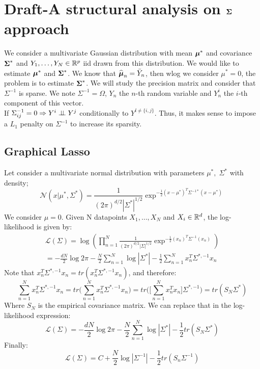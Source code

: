 \section{Draft-A structural analysis on $\boldsymbol\Sigma$ approach}

We consider a multivariate Gaussian distribution with mean $\boldsymbol\mu^*$ and covariance $\boldsymbol\Sigma^*$ and $Y_1,\dots,Y_N \in {\mathbb R}^p$ iid drawn from this distribution. We would like to estimate $\boldsymbol\mu^*$ and $\boldsymbol\Sigma^*$. We know that $\widehat{\boldsymbol\mu}_n=\bar Y_n$, then wlog we consider $\mu^*=0$, the problem is to estimate $\boldsymbol\Sigma^*$. We will study the precision matrix and consider that $\Sigma^{-1}$ is sparse. We note $\Sigma^{-1}=\Omega$, $Y_n$ the $n$-th random variable and $Y_n^i$ the $i$-th component of this vector.\\
If $\Sigma^{-1}_{ij}=0 \Rightarrow Y^i \perp\!\!\!\perp Y^j$ conditionally to $Y^{l\ne\{i,j\}}$. Thus, it makes sense to impose a $L_1$ penalty on $\Sigma^{-1}$ to increase its sparsity.

\subsection{Graphical Lasso}
Let consider a multivariate normal distribution with parameters $\mu^*,\; \Sigma^*$ with density;
\begin{equation}
\mathcal N(x|\mu^*,\Sigma^*)
=\frac{1}{(2\pi)^{d/2}|\Sigma^*|^{1/2}}\exp^{-\frac{1}{2}(x-\mu^*)^T\Sigma^{-1*}(x-\mu^*)}
\end{equation}
We consider $\mu=0$. Given N datapoints $X_1,\dots,X_N$ and $X_i \in {\mathbb R}^d$, the log-likelihood is given by:
\begin{equation}
\begin{split}
\mathcal{L}(\Sigma)=\log\left(\prod_{n=1}^N\frac{1}{(2\pi)^{d/2}|\Sigma|^{1/2}}\exp^{-\frac{1}{2}(x_n)^T\Sigma^{-1}(x_n)}\right)\\
=-\frac{dN}{2}\log 2\pi - \frac{N}{2}\sum_{n=1}^N\log |\Sigma^*|- \frac{1}{2}\sum_{n=1}^N x_n^T\Sigma^{*,-1}x_n
\end{split}
\end{equation}
Note that $x_n^T\Sigma^{*,-1}x_n=tr(x_n^T\Sigma^{*,-1}x_n)$, and therefore:
\begin{equation}
\sum_{n=1}^N x_n^T\Sigma^{*,-1}x_n=tr\big(\sum_{n=1}^N x_n^T\Sigma^{*,-1}x_n\big)=tr\Big(\big[\sum_{n=1}^N x_n^Tx_n\big]\Sigma^{*,-1}\Big)=tr(S_N\Sigma^*)
\end{equation}
Where $S_N$ is the empirical covariance matrix. We can replace that in the log-likelihood expression:
\begin{equation}
\mathcal{L}(\Sigma)=-\frac{dN}{2}\log 2\pi - \frac{N}{2}\sum_{n=1}^N\log |\Sigma^*|- \frac{1}{2}tr(S_N\Sigma^*)
\end{equation}
Finally:
\begin{equation}
\mathcal{L}(\Sigma)=C+\frac{N}{2}\log|\Sigma^{-1}|-\frac{1}{2} tr(S_n\Sigma^{-1})
\end{equation}

